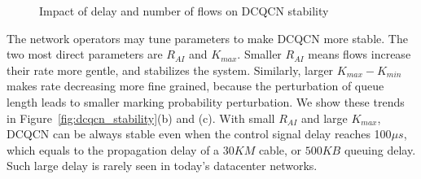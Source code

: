\begin{figure}
\caption{Impact of delay and number of flows on DCQCN stability}
\label{fig:dcqcn_unstable}
\end{figure}
The network operators may tune parameters to make DCQCN more stable. The two
most direct parameters are $R_{AI}$ and $K_{max}$.  Smaller $R_{AI}$ means flows
increase their rate more gentle, and stabilizes the system. Similarly, larger
$K_{max} - K_{min}$ makes rate decreasing more fine grained, because the
perturbation of queue length leads to smaller marking probability perturbation.
We show these trends in Figure~\ref{fig:dcqcn_stability}(b) and (c). With small
$R_{AI}$ and large $K_{max}$, DCQCN can be always stable even when the control
signal delay reaches 100$\mu s$, which equals to the propagation delay of a
$30KM$ cable, or $500KB$ queuing delay. Such large delay is rarely seen in
today's datacenter networks.

